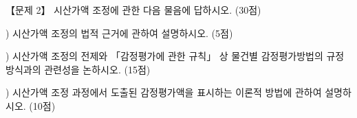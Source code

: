 \begin{longquestion}{【문제 2】}
시산가액 조정에 관한 다음 물음에 답하시오. (30점) \par
\medskip{}) 시산가액 조정의 법적 근거에 관하여 설명하시오. (5점) \par
\medskip{}) 시산가액 조정의 전제와 「감정평가에 관한 규칙」 상 물건별 감정평가방법의 규정방식과의 관련성을 논하시오. (15점) \par
\medskip{}) 시산가액 조정 과정에서 도출된 감정평가액을 표시하는 이론적 방법에 관하여 설명하시오. (10점) \par
\end{longquestion}
